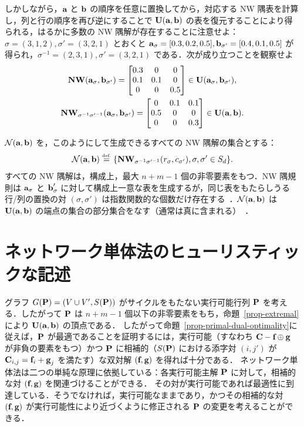 しかしながら，$\a$ と $\b$ の順序を任意に置換してから，対応する NW 隅表を計算し，列と行の順序を再び逆にすることで $\CouplingsD(\a,\b)$ の表を復元することにより得られる，はるかに多数の NW 隅解が存在することに注意せよ：$\sigma=(3,1,2),\sigma'=(3,2,1)$ とおくと $\a_\sigma=[0.3,0.2,0.5], \b_{\sigma'}=[0.4,0.1,0.5]$ が得られ，$\sigma^{-1}=(2,3,1),\sigma'=(3,2,1)$ である．次が成り立つことを観察せよ
\begin{gather*}
\NW(\a_\sigma,\b_{\sigma'}) = \begin{bmatrix} 0.3 & 0 & 0 \\ 0.1 & 0.1 & 0 \\ 0& 0 & 0.5\end{bmatrix} \in \CouplingsD(\a_\sigma,\b_{\sigma'}),\\
\NW_{\sigma^{-1}\sigma'^{-1}}(\a_\sigma,\b_{\sigma'})= \begin{bmatrix} 0 & 0.1 & 0.1 \\ 0.5 & 0 & 0 \\ 0& 0 & 0.3\end{bmatrix}\in \CouplingsD(\a,\b).
\end{gather*}

$\mathcal{N}(\a,\b)$ を，このようにして生成できるすべての NW 隅解の集合とする：
$$\mathcal{N}(\a,\b)\eqdef\{ \NW_{\sigma^{-1}\sigma'^{-1}}(r_\sigma,c_{\sigma'}), \sigma,\sigma'\in S_d\}.$$
すべての NW 隅解は，構成上，最大 $n+m-1$ 個の非零要素をもつ．NW 隅規則は $\a_\sigma$ と $\b_\sigma'$ に対して構成上一意な表を生成するが，同じ表をもたらしうる行/列の置換の対 $(\sigma,\sigma')$ は指数関数的な個数だけ存在する~\citep[p. 2]{stougie2002polynomial}．$\mathcal{N}(\a,\b)$ は $\CouplingsD(\a,\b)$ の端点の集合の部分集合をなす（通常は真に含まれる）~\citep[Cor. 8.1.4]{brualdi2006combinatorial}．



\section{ネットワーク単体法のヒューリスティックな記述}\label{s-networksimplex}

グラフ $G(\P)=(V\cup V',S(\P))$ がサイクルをもたない実行可能行列 $\P$ を考える．したがって $\P$ は $n+m-1$ 個以下の非零要素をもち，命題~\ref{prop-extremal}により $\CouplingsD(\a,\b)$ の頂点である．
%
したがって命題~\ref{prop-primal-dual-optimality}に従えば，$\P$ が最適であることを証明するには，実行可能（すなわち $\C-\fD\oplus\gD$ が非負の要素をもつ）かつ $\P$ に相補的（$S(\P)$ における添字対 $(i,j')$ が $\C_{i,j}=\fD_i+\gD_j$ を満たす）な双対解 $(\fD,\gD)$ を得れば十分である．
%
ネットワーク単体法は二つの単純な原理に依拠している：各実行可能主解 $\P$ に対して，相補的な対 $(\fD,\gD)$ を関連づけることができる．
%
その対が実行可能であれば最適性に到達している．そうでなければ，実行可能なままであり，かつその相補的な対 $(\fD,\gD)$ が実行可能性により近づくように修正される $\P$ の変更を考えることができる．

